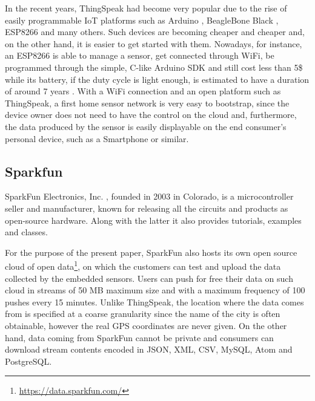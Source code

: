 In the recent years, ThingSpeak had become very popular due to the rise of easily programmable IoT platforms such as Arduino \cite{arduino}, BeagleBone Black \cite{bbblack}, ESP8266 \cite{esp8266} and many others.
Such devices are becoming cheaper and cheaper and, on the other hand, it is easier to get started with them.
Nowadays, for instance, an ESP8266 is able to manage a sensor, get connected through WiFi, be programmed through the simple, C-like Arduino SDK and still cost less than 5\$ while its battery, if the duty cycle is light enough, is estimated to have a duration of around 7 years \cite{di2015design}.
With a WiFi connection and an open platform such as ThingSpeak, a first home sensor network is very easy to bootstrap, since the device owner does not need to have the control on the cloud and, furthermore, the data produced by the sensor is easily displayable on the end consumer's personal device, such as a Smartphone or similar.

\subsection{Sparkfun}
SparkFun Electronics, Inc. \cite{sparkfun}, founded in 2003 in Colorado, is a microcontroller seller and manufacturer, known for releasing all the circuits and products as open-source hardware. Along with the latter it also provides tutorials, examples and classes.

For the purpose of the present paper, SparkFun also hosts its own open source cloud of open data\footnote{\url{https://data.sparkfun.com/}}, on which the customers can test and upload the data collected by the embedded sensors. %
Users can push for free their data on such cloud in streams of 50 MB maximum size and with a maximum frequency of 100 pushes every 15 minutes.
Unlike ThingSpeak, the location where the data comes from is specified at a coarse granularity since the name of the city is often obtainable, however the real GPS coordinates are never given.
On the other hand, data coming from SparkFun cannot be private and consumers can download stream contents encoded in JSON, XML, CSV, MySQL, Atom and PostgreSQL.